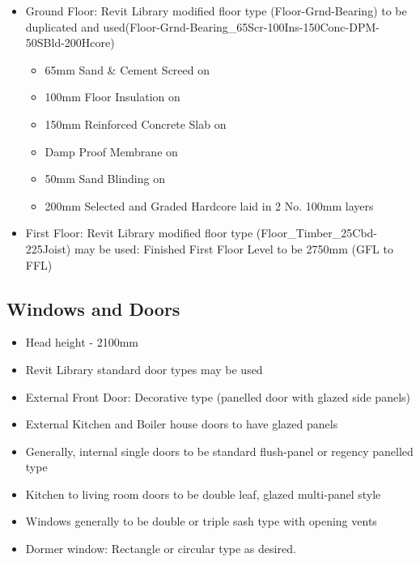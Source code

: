 \begin{itemize}
	\item Ground Floor: Revit Library modified floor type (Floor-Grnd-Bearing) to be duplicated and used(Floor-Grnd-Bearing\_65Scr-100Ins-150Conc-DPM-50SBld-200Hcore)
	\begin{itemize}
		\item 65mm Sand \& Cement Screed on
		\item 100mm Floor Insulation on
		\item 150mm Reinforced Concrete Slab on
		\item Damp Proof Membrane on
		\item 50mm Sand Blinding on 
		\item 200mm Selected and Graded Hardcore laid in 2 No. 100mm layers
	\end{itemize}
	\item First Floor: Revit Library modified floor type (Floor\_Timber\_25Cbd-225Joist) may be used: Finished First Floor Level to be 2750mm (GFL to FFL)

\end{itemize}












\subsection*{Windows and Doors}
\begin{itemize}
	\item Head height - 2100mm
	\item Revit Library standard door types may be used
	\item External Front Door: Decorative type (panelled door with glazed side panels)
	\item External Kitchen and Boiler house doors to have glazed panels
	\item Generally, internal single doors to be standard flush-panel or regency panelled type
	\item Kitchen to living room doors to be double leaf, glazed multi-panel style
	\item Windows generally to be double or triple sash type with opening vents
	\item Dormer window: Rectangle or circular type as desired.
\end{itemize}







